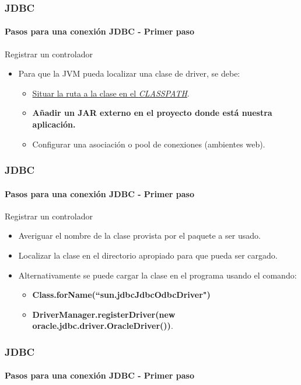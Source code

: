 \documentclass{beamer}
\begin{document}
    \begin{frame}
		\frametitle{JDBC}
		\framesubtitle{Pasos para una conexi\'on JDBC - Primer paso}

        \begin{exampleblock}{Registrar un controlador}
		    \begin{itemize}
		        \item Para que la JVM pueda localizar una clase de driver, se debe:
		        \begin{itemize}
		            \item \underline{Situar la ruta a la clase en el \emph{CLASSPATH}}.
		            \item \textbf{A\~nadir un JAR externo en el proyecto donde est\'a nuestra aplicaci\'on.}
		            \item Configurar una asociaci\'on o pool de conexiones (ambientes web).
		        \end{itemize}
		    \end{itemize}
		\end{exampleblock}
	\end{frame}

	\begin{frame}
		\frametitle{JDBC}
		\framesubtitle{Pasos para una conexi\'on JDBC - Primer paso}

        \begin{exampleblock}{Registrar un controlador}
		    \begin{itemize}
		        \item Averiguar el nombre de la clase provista por el paquete a ser usado.
		        \item Localizar la clase en el directorio apropiado para que pueda ser cargado.
		        \item Alternativamente se puede cargar la clase en el programa usando el comando:
		        \begin{itemize}
		            \item \textbf{Class.forName(``sun.jdbcJdbcOdbcDriver")}
		            \item \textbf{DriverManager.registerDriver(new oracle.jdbc.driver.OracleDriver())}.
		        \end{itemize}
		    \end{itemize}
		\end{exampleblock}
	\end{frame}

	\begin{frame}
		\frametitle{JDBC}
		\framesubtitle{Pasos para una conexi\'on JDBC - Primer paso}

        
	\end{frame}
\end{document}
